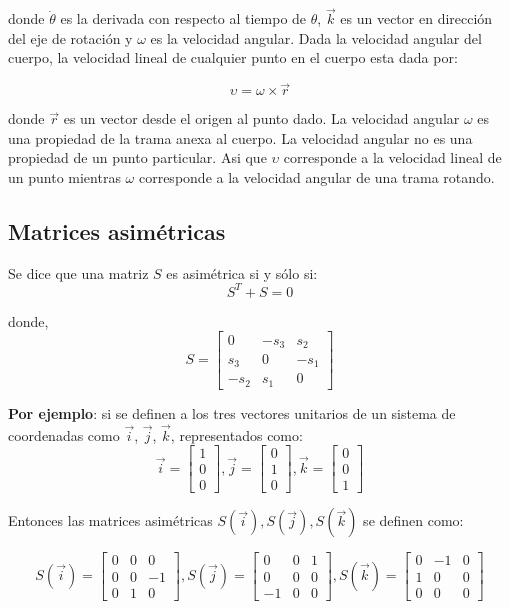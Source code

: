 \documentclass[10pt,a4paper]{article}
\begin{document}
donde $\dot{\theta}$ es la derivada con respecto al tiempo de $\theta$, $\vec{k}$ es un vector en dirección del eje de rotación y $\omega$ es la velocidad angular. Dada la velocidad angular del cuerpo, la velocidad lineal de cualquier punto en el cuerpo esta dada por:

$$ \upsilon = \omega \times \vec{r}$$

donde $\vec{r}$ es un vector desde el origen al punto dado. La velocidad angular $\omega$ es una propiedad de la trama anexa al cuerpo. La velocidad angular no es una propiedad de un punto particular. Asi que $\upsilon$ corresponde a la velocidad lineal de un punto mientras $\omega$ corresponde a la velocidad angular de una trama rotando.

\subsection{Matrices asimétricas}
Se dice que una matriz $S$ es asimétrica si y sólo si:
$$ S^T + S = 0$$

donde,
$$
	S =
	\begin{bmatrix}
		0    & -s_3 & s_2\\
		s_3  & 0    & -s_1\\
		-s_2 & s_1  & 0
	\end{bmatrix}
$$

\textbf{Por ejemplo}: si se definen a los tres vectores unitarios de un sistema de coordenadas como $\vec{i}$, $\vec{j}$, $\vec{k}$, representados como:
$$
	\vec{i} =
	\begin{bmatrix}
		1 \\ 0 \\ 0
	\end{bmatrix},
	\vec{j} =
	\begin{bmatrix}
		0 \\ 1 \\ 0
	\end{bmatrix},
	\vec{k} =
	\begin{bmatrix}
		0 \\ 0 \\ 1
	\end{bmatrix}
$$

Entonces las matrices asimétricas $S(\vec{i}), S(\vec{j}), S(\vec{k})$ se definen como:

$$
	S(\vec{i}) =
	\begin{bmatrix}
		0 & 0 & 0 \\
		0 & 0 & -1\\
		0 & 1 & 0
	\end{bmatrix},
	S(\vec{j}) =
	\begin{bmatrix}
		0 & 0 & 1 \\
		0 & 0 & 0\\
		-1& 0 & 0
	\end{bmatrix},
	S(\vec{k}) =
	\begin{bmatrix}
		0 & -1 & 0 \\
		1 & 0 & 0\\
		0 & 0 & 0
	\end{bmatrix}
$$
\end{document}
